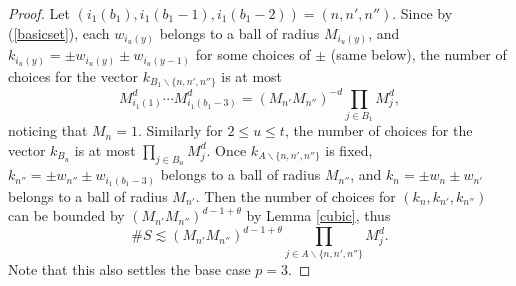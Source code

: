 \documentclass[11 pt,reqno]{amsart}
\theoremstyle{definition}
\theoremstyle{remark}
\numberwithin{equation}{section}
\begin{document}
{\begin{proof}
Let $(i_1(b_1),i_1(b_1-1),i_1(b_1-2))=(n,n',n'')$. Since by (\ref{basicset}), each $w_{i_u(y)}$ belongs to a ball of radius $M_{i_u(y)}$, and $k_{i_u(y)}=\pm w_{i_u(y)}\pm w_{i_u(y-1)}$ for some choices of $\pm$ (same below), the number of choices for the vector $k_{B_1\backslash\{n,n',n''\}}$ is at most\[M_{i_1(1)}^d\cdots M_{i_1(b_1-3)}^d=(M_{n'}M_{n''})^{-d}\prod_{j\in B_1}M_j^d,\] noticing that $M_n=1$. Similarly for $2\leq u\leq t$, the number of choices for the vector $k_{B_u}$ is at most $\prod_{j\in B_u}M_j^d$. Once $k_{A\backslash\{n,n',n''\}}$ is fixed, $k_{n''}=\pm w_{n''}\pm w_{i_1(b_1-3)}$ belongs to a ball of radius $M_{n''}$, and $k_n=\pm w_n\pm w_{n'}$ belongs to a ball of radius $M_{n'}$. Then the number of choices for $(k_n,k_{n'},k_{n''})$ can be bounded by $(M_{n'}M_{n''})^{d-1+\theta}$ by Lemma \ref{cubic}, thus
\begin{equation}\label{interpolate1}\#S\lesssim (M_{n'}M_{n''})^{d-1+\theta}\prod_{j\in A\backslash\{n,n',n''\}}M_j^d.\end{equation} Note that this also settles the base case $p=3$.


\end{proof}}
\end{document}
